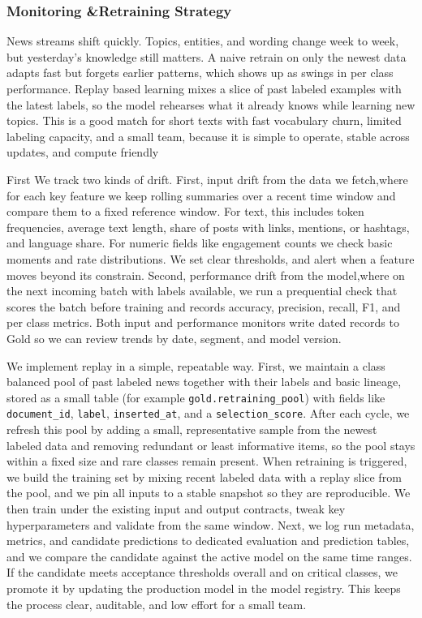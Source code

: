 \subsubsection{Monitoring \&Retraining Strategy}

News streams shift quickly. Topics, entities, and wording change week to week, but yesterday’s knowledge still matters. A naive retrain on only the newest data adapts fast but forgets earlier patterns, which shows up as swings in per class performance. Replay based learning mixes a slice of past labeled examples with the latest labels, so the model rehearses what it already knows while learning new topics. This is a good match for short texts with fast vocabulary churn, limited labeling capacity, and a small team, because it is simple to operate, stable across updates, and compute friendly
\smallbreak

First We track two kinds of drift. First, input drift from the data we fetch,where for each key feature we keep rolling summaries over a recent time window and compare them to a fixed reference window. For text, this includes token frequencies, average text length, share of posts with links, mentions, or hashtags, and language share. For numeric fields like engagement counts we check basic moments and rate distributions. We set clear thresholds, and alert when a feature moves beyond its constrain. Second, performance drift from the model,where on the next incoming batch with labels available, we run a prequential check that scores the batch before training and records accuracy,  precision,  recall,  F1, and per class metrics. Both input and performance monitors write dated records to Gold so we can review trends by date, segment, and model version.

\smallbreak

We implement replay in a simple, repeatable way. First, we maintain a class balanced pool of past labeled news together with their labels and basic lineage, stored as a small table (for example \texttt{gold.retraining\_pool}) with fields like \texttt{document\_id}, \texttt{label}, \texttt{inserted\_at}, and a \texttt{selection\_score}. After each cycle, we refresh this pool by adding a small, representative sample from the newest labeled data and removing redundant or least informative items, so the pool stays within a fixed size and rare classes remain present. When retraining is triggered, we build the training set by mixing recent labeled data with a replay slice from the pool, and we pin all inputs to a stable snapshot so they are reproducible. We then train under the existing input and output contracts, tweak key hyperparameters and validate  from the same window. Next, we log run metadata, metrics, and candidate predictions to dedicated evaluation and prediction tables, and we compare the candidate against the active model on the same time ranges. If the candidate meets acceptance thresholds overall and on critical classes, we promote it by updating the production model in the model registry. This keeps the process clear, auditable, and low effort for a small team.



